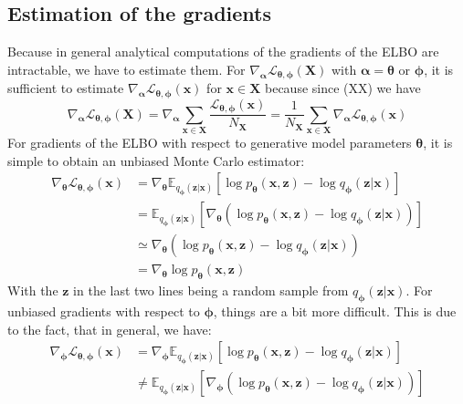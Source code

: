 \documentclass[12pt]{report}
\begin{document}
\subsection{Estimation of the gradients}
Because in general analytical computations of the gradients of the ELBO are intractable, we have to estimate them. For $\nabla_{\pmb{\alpha}}\mathcal{L}_{\pmb{\theta}, \pmb{\phi}}(\mathbf{X})$ with $\pmb{\alpha} = \pmb{\theta}$ or $\pmb{\phi}$, it is sufficient to estimate $\nabla_{\pmb{\alpha}}\mathcal{L}_{\pmb{\theta}, \pmb{\phi}}(\mathbf{x})$ for $\mathbf{x} \in \mathbf{X}$ because since (XX) we have
\begin{equation}
	\nabla_{\pmb{\alpha}}\mathcal{L}_{\pmb{\theta}, \pmb{\phi}}(\mathbf{X}) = \nabla_{\pmb{\alpha}}  \sum_{\mathbf{x} \in \mathbf{X}} \frac{\mathcal{L}_{\mathbf{\theta}, \mathbf{\phi}}(\mathbf{x})}{N_{\mathbf{X}}} = \frac{1}{N_{\mathbf{X}}} \sum_{\mathbf{x} \in \mathbf{X}} \nabla_{\pmb{\alpha}} \mathcal{L}_{\mathbf{\theta}, \mathbf{\phi}}(\mathbf{x})
\end{equation}
For gradients of the ELBO with respect to generative model parameters $\pmb{\theta}$, it is simple to obtain an unbiased Monte Carlo estimator:
\begin{equation}
\begin{split}
\nabla_{\pmb{\theta}}\mathcal{L}_{\pmb{\theta}, \pmb{\phi}}(\mathbf{x}) 
& = \nabla_{\pmb{\theta}} \mathbb{E}_{q_{\mathbf{\phi}}(\mathbf{z}|\mathbf{x})}\left[ \log p_{\mathbf{\theta}}(\mathbf{x}, \mathbf{z}) - \log q_{\mathbf{\phi}}(\mathbf{z}|\mathbf{x}) \right]	\\
& = \mathbb{E}_{q_{\mathbf{\phi}}(\mathbf{z}|\mathbf{x})}\left[ \nabla_{\pmb{\theta}} (\log p_{\mathbf{\theta}}(\mathbf{x}, \mathbf{z}) - \log q_{\mathbf{\phi}}(\mathbf{z}|\mathbf{x})) \right] \\
& \simeq \nabla_{\pmb{\theta}} (\log p_{\mathbf{\theta}}(\mathbf{x}, \mathbf{z}) - \log q_{\mathbf{\phi}}(\mathbf{z}|\mathbf{x})) \\
& = \nabla_{\pmb{\theta}} \log p_{\mathbf{\theta}}(\mathbf{x}, \mathbf{z})
\end{split}
\end{equation}
With the $\mathbf{z}$ in the last two lines being a random sample from $q_{\mathbf{\phi}}(\mathbf{z}|\mathbf{x})$. For unbiased gradients with respect to $\pmb{\phi}$, things are a bit more difficult. This is due to the fact, that in general, we have:
\begin{equation}
\begin{split}
\nabla_{\pmb{\phi}}\mathcal{L}_{\pmb{\theta}, \pmb{\phi}}(\mathbf{x}) 
& = \nabla_{\pmb{\phi}} \mathbb{E}_{q_{\mathbf{\phi}}(\mathbf{z}|\mathbf{x})}\left[ \log p_{\mathbf{\theta}}(\mathbf{x}, \mathbf{z}) - \log q_{\mathbf{\phi}}(\mathbf{z}|\mathbf{x}) \right]	\\
& \neq \mathbb{E}_{q_{\mathbf{\phi}}(\mathbf{z}|\mathbf{x})}\left[ \nabla_{\pmb{\phi}} (\log p_{\mathbf{\theta}}(\mathbf{x}, \mathbf{z}) - \log q_{\pmb{\phi}}(\mathbf{z}|\mathbf{x})) \right] \\
\end{split}
\end{equation}
\end{document}
